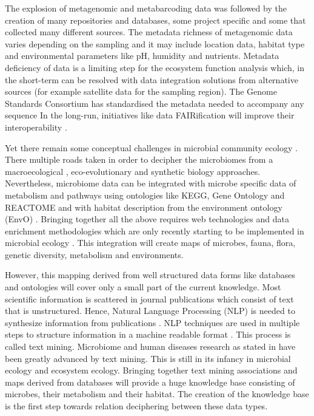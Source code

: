 The explosion of metagenomic and metabarcoding data was followed by the creation
of many repositories and databases, some project specific and some that
collected many different sources. The metadata richness of metagenomic data
varies depending on the sampling and it may include location data, habitat type
and environmental parameters like pH, humidity and nutrients. Metadata
deficiency of data is a limiting step for the ecosystem function analysis
which, in the short-term can be resolved with data integration solutions from
alternative sources (for example satellite data for the sampling region). 
The Genome Standards Consortium has standardised the metadata needed 
to accompany any sequence \parencite{yilmaz2011minimum,Field2011}
In the long-run, initiatives like data FAIRification will improve their
interoperability \parencite{wilkinson2016the-fair}.

Yet there remain some conceptual challenges in microbial community ecology \parencite{prosser2020Conceptual}.
There multiple roads taken in order to decipher the microbiomes from a macroecological \parencite{Mascarenhas2020}, 
eco-evolutionary \parencite{martiny2023Investigating, loreau2023Opportunities}
and synthetic biology \parencite{Leggieri2021} approaches.
Nevertheless, microbiome data can be integrated with microbe
specific data of metabolism and pathways using ontologies like KEGG, Gene
Ontology and REACTOME and with habitat description from the environment
ontology (EnvO) \parencite{buttigieg2016environment}. Bringing together all the above requires web technologies and
data enrichment methodologies which are only recently starting to be
implemented in microbial ecology \parencite{jiang2016Microbiome}. This integration
will create maps of microbes, fauna, flora, genetic diversity, metabolism and environments. 

However, this mapping derived from well structured data forms like databases
and ontologies will cover only a small part of the current knowledge. Most
scientific information is scattered in journal publications which consist of
text that is unstructured. Hence, Natural Language Processing (NLP) is needed to synthesize
information from publications \parencite{jensen2006Literature,}.
NLP techniques are used in multiple steps to structure information in a machine readable 
format \parencite{10.5555/1199003}. This process is called text mining.
Microbiome and
human diseases research as stated in \parencite{badal2019Challenges} have been
greatly advanced by text mining. This is still in its infancy in microbial
ecology and ecosystem ecology. Bringing together text mining associations and maps derived from
databases will provide a huge knowledge base consisting of microbes, their
metabolism and their habitat. The creation of the knowledge base is the first
step towards relation deciphering between these data types.

